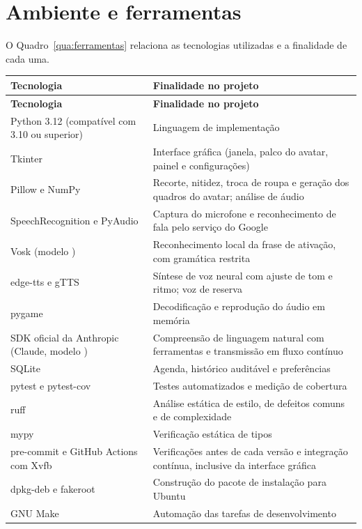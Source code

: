\section{Ambiente e ferramentas}

O Quadro~\ref{qua:ferramentas} relaciona as tecnologias utilizadas e a finalidade de cada uma.

\begin{singlespace}
\label{qua:ferramentas}
\small
\begin{tabularx}{\textwidth}{|P{4.3cm}|L|}
\hline
\textbf{Tecnologia} & \textbf{Finalidade no projeto} \\ \hline
\endfirsthead
\hline
\textbf{Tecnologia} & \textbf{Finalidade no projeto} \\ \hline
\endhead
Python 3.12 (compatível com 3.10 ou superior) & Linguagem de implementação \\ \hline
Tkinter & Interface gráfica (janela, palco do avatar, painel e configurações) \\ \hline
Pillow e NumPy \cite{harris2020} & Recorte, nitidez, troca de roupa e geração dos quadros do avatar; análise de áudio \\ \hline
SpeechRecognition e PyAudio & Captura do microfone e reconhecimento de fala pelo serviço do Google \\ \hline
Vosk (modelo ) & Reconhecimento local da frase de ativação, com gramática restrita \\ \hline
edge-tts e gTTS & Síntese de voz neural com ajuste de tom e ritmo; voz de reserva \\ \hline
pygame & Decodificação e reprodução do áudio em memória \\ \hline
SDK oficial da Anthropic (Claude, modelo ) & Compreensão de linguagem natural com ferramentas e transmissão em fluxo contínuo \\ \hline
SQLite & Agenda, histórico auditável e preferências \\ \hline
pytest e pytest-cov & Testes automatizados e medição de cobertura \\ \hline
ruff & Análise estática de estilo, de defeitos comuns e de complexidade \\ \hline
mypy & Verificação estática de tipos \\ \hline
pre-commit e GitHub Actions com Xvfb & Verificações antes de cada versão e integração contínua, inclusive da interface gráfica \\ \hline
dpkg-deb e fakeroot & Construção do pacote de instalação para Ubuntu \\ \hline
GNU Make & Automação das tarefas de desenvolvimento \\ \hline
\end{tabularx}
\end{singlespace}

